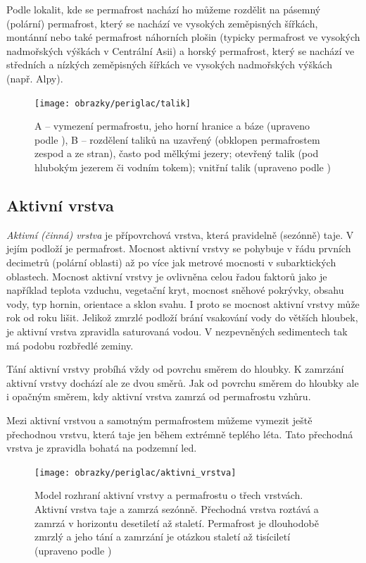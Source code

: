 Podle lokalit, kde se permafrost nachází ho můžeme rozdělit na pásemný (polární) permafrost, který se nachází ve vysokých zeměpisných šířkách, montánní nebo také permafrost náhorních plošin (typicky permafrost ve vysokých nadmořských výškách v Centrální Asii) a horský permafrost, který se nachází ve středních a nízkých zeměpisných šířkách ve vysokých nadmořských výškách (např. Alpy).

\begin{figure}[h]
	\centering
	\texttt{[image: obrazky/periglac/talik]}
	\caption{A -- vymezení permafrostu, jeho horní hranice a báze (upraveno podle \textcite{jrPermafrostRelatedEngineering1969}), B -- rozdělení taliků na uzavřený (obklopen permafrostem zespod a ze stran), často pod mělkými jezery; otevřený talik (pod hlubokým jezerem či vodním tokem); vnitřní talik (upraveno podle \textcite{demekObecnaGeomorfologie1987})}
	\label{fig:talik}
\end{figure}

\subsection{Aktivní vrstva}
\emph{Aktivní (činná) vrstva} je přípovrchová vrstva, která pravidelně (sezónně) taje. V jejím podloží je permafrost. Mocnost aktivní vrstvy se pohybuje v řádu prvních decimetrů (polární oblasti) až po více jak metrové mocnosti v subarktických oblastech. Mocnost aktivní vrstvy je ovlivněna celou řadou faktorů jako je například teplota vzduchu, vegetační kryt, mocnost sněhové pokrývky, obsahu vody, typ hornin, orientace a sklon svahu. I proto se mocnost aktivní vrstvy může rok od roku lišit. Jelikož zmrzlé podloží brání vsakování vody do větších hloubek, je aktivní vrstva zpravidla saturovaná vodou. V nezpevněných sedimentech tak má podobu rozbředlé zeminy. 

Tání aktivní vrstvy probíhá vždy od povrchu směrem do hloubky. K zamrzání aktivní vrstvy dochází ale ze dvou směrů. Jak od povrchu směrem do hloubky ale i opačným směrem, kdy aktivní vrstva zamrzá od permafrostu vzhůru. 

Mezi aktivní vrstvou a samotným permafrostem můžeme vymezit ještě přechodnou vrstvu, která taje jen během extrémně teplého léta. Tato přechodná vrstva je zpravidla bohatá na podzemní led.

\begin{figure}[h]
	\centering
	\texttt{[image: obrazky/periglac/aktivni\_vrstva]}
	\caption{Model rozhraní aktivní vrstvy a permafrostu o třech vrstvách. Aktivní vrstva taje a zamrzá sezónně. Přechodná vrstva roztává a zamrzá v horizontu desetiletí až staletí. Permafrost je dlouhodobě zmrzlý a jeho tání a zamrzání je otázkou staletí až tisíciletí (upraveno podle \textcite{frenchPeriglacialEnvironment2017})}
	\label{fig:aktivnivrstva}
\end{figure}


